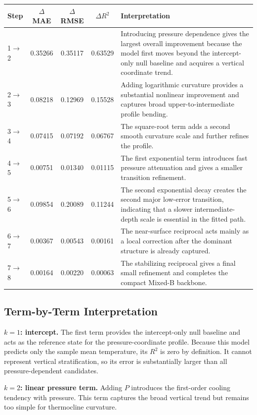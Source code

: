 \documentclass[10pt]{article}
\begin{document}
\begingroup
\small
\setlength{\tabcolsep}{5pt}
\renewcommand{\arraystretch}{1.12}
\begin{tabular}{C{1.2cm}cccL{7.2cm}}
\toprule
Step & $\Delta$MAE & $\Delta$RMSE & $\Delta R^2$ & Interpretation \\
$\rightarrow$2 & 0.35266 & 0.35117 & 0.63529 & Introducing pressure dependence gives the largest overall improvement because the model first moves beyond the intercept-only null baseline and acquires a vertical coordinate trend. \\
2$\rightarrow$3 & 0.08218 & 0.12969 & 0.15528 & Adding logarithmic curvature provides a substantial nonlinear improvement and captures broad upper-to-intermediate profile bending. \\
3$\rightarrow$4 & 0.07415 & 0.07192 & 0.06767 & The square-root term adds a second smooth curvature scale and further refines the profile. \\
4$\rightarrow$5 & 0.00751 & 0.01340 & 0.01115 & The first exponential term introduces fast pressure attenuation and gives a smaller transition refinement. \\
5$\rightarrow$6 & 0.09854 & 0.20089 & 0.11244 & The second exponential decay creates the second major low-error transition, indicating that a slower intermediate-depth scale is essential in the fitted path. \\
6$\rightarrow$7 & 0.00367 & 0.00543 & 0.00161 & The near-surface reciprocal acts mainly as a local correction after the dominant structure is already captured. \\
7$\rightarrow$8 & 0.00164 & 0.00220 & 0.00063 & The stabilizing reciprocal gives a final small refinement and completes the compact Mixed-B backbone. \\
\bottomrule
\end{tabular}
\endgroup

\subsection{Term-by-Term Interpretation}

\noindent\textbf{$k=1$: intercept.}
The first term provides the intercept-only null baseline and acts as the reference state for the pressure-coordinate profile.
Because this model predicts only the sample mean temperature, its $R^2$ is zero by definition.
It cannot represent vertical stratification, so its error is substantially larger than all pressure-dependent candidates.

\vspace{0.25em}
\noindent\textbf{$k=2$: linear pressure term.}
Adding $P$ introduces the first-order cooling tendency with pressure.
This term captures the broad vertical trend but remains too simple for thermocline curvature.
\end{document}
